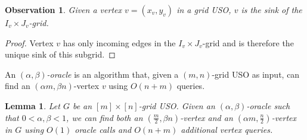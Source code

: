 \documentclass[a4paper,10pt]{article}
\newtheorem{observation}{Observation}
\newtheorem{lemma}{Lemma}
\begin{document}
\begin{observation}\label{Obs:Sink of dominated grid}
Given a vertex  $v = (x_v, y_v)$ in a grid USO, $v$ is the sink of the $I_v\times J_v$-grid.
\end{observation}
\begin{proof}
Vertex $v$ has only incoming edges in the $I_v\times J_v$-grid and is therefore the unique sink of this subgrid. 
\end{proof}

An \emph{$(\alpha, \beta)$-oracle} is an algorithm that, given a $(m, n)$-grid USO as input, can find an $(\alpha m, \beta n)$-vertex $v$ using $O(n + m)$ queries.

\begin{lemma}\label{lemma:Climbing lemma}
Let $G$ be an $[m]\times [n]$-grid USO.
Given an $(\alpha, \beta)$-oracle such that $0 < \alpha, \beta  < 1$, we can find both an $(\frac{m}{2}, \beta n)$-vertex and an $(\alpha m, \frac{n}{2})$-vertex in $G$ using $O(1)$ oracle calls and $O(n+m)$ additional vertex queries.
\end{lemma}
\end{document}
